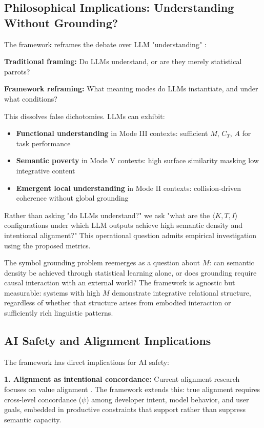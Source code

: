 \documentclass[12pt]{article}
\begin{document}
\subsection{Philosophical Implications: Understanding Without Grounding?}

The framework reframes the debate over LLM "understanding" \citep{shanahan2024talking, chalmers2023could}:

\textbf{Traditional framing:} Do LLMs understand, or are they merely statistical parrots?

\textbf{Framework reframing:} What meaning modes do LLMs instantiate, and under what conditions?

This dissolves false dichotomies. LLMs can exhibit:
\begin{itemize}
\item \textbf{Functional understanding} in Mode III contexts: sufficient $M$, $C_T$, $A$ for task performance
\item \textbf{Semantic poverty} in Mode V contexts: high surface similarity masking low integrative content
\item \textbf{Emergent local understanding} in Mode II contexts: collision-driven coherence without global grounding
\end{itemize}

Rather than asking "do LLMs understand?" we ask "what are the $\langle K, T, I \rangle$ configurations under which LLM outputs achieve high semantic density and intentional alignment?" This operational question admits empirical investigation using the proposed metrics.

The symbol grounding problem \citep{harnad1990symbol} reemerges as a question about $M$: can semantic density be achieved through statistical learning alone, or does grounding require causal interaction with an external world? The framework is agnostic but measurable: systems with high $M$ demonstrate integrative relational structure, regardless of whether that structure arises from embodied interaction or sufficiently rich linguistic patterns.

\subsection{AI Safety and Alignment Implications}

The framework has direct implications for AI safety:

\textbf{1. Alignment as intentional concordance:} Current alignment research focuses on value alignment \citep{gabriel2020artificial}. The framework extends this: true alignment requires cross-level concordance ($\psi$) among developer intent, model behavior, and user goals, embedded in productive constraints that support rather than suppress semantic capacity.
\end{document}

